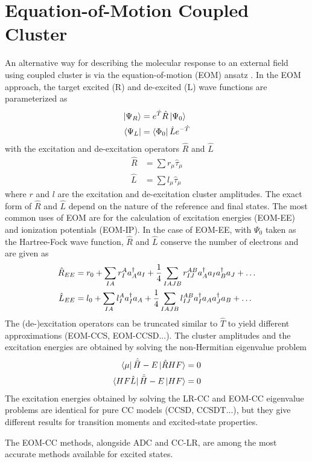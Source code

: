 
\section{Equation-of-Motion Coupled Cluster}

An alternative way for describing the molecular response to an external field using coupled cluster is via the equation-of-motion (EOM) ansatz \cite{Gee1989,EMr1981,Sta1993,Sta1994,Kry2008}. In the EOM approach, the target excited (R) and de-excited (L) wave functions are parameterized as 
\begin{align}
\ket{\smash{\Psi_R}} &= e^{\hat{T}} \hat{R} \ket{\smash{\Psi_0}} \\
\bra{\smash{\Psi_L}} &= \bra{\smash{\Phi_0}} \hat{L} e^{-\hat{T}} 
\end{align}
\noindent with the excitation and de-excitation operators $\hat{R}$ and $\hat{L}$ 
\begin{align}
\hat{R} &= \sum r_{\mu} \hat{\tau}_{\mu} \\
\hat{L} &= \sum l_{\mu} \hat{\tau}_{\mu}
\end{align}
\noindent where $r$ and $l$ are the excitation and de-excitation cluster amplitudes. The exact form of $\hat{R}$ and $\hat{L}$ depend on the nature of the reference and final states. The most common uses of EOM are for the calculation of excitation energies (EOM-EE) and ionization potentials (EOM-IP). In the case of EOM-EE, with $\Psi_0$ taken as the Hartree-Fock wave function, $\hat{R}$ and $\hat{L}$ conserve the number of electrons and are given as
\begin{align}
\hat{R}_{EE} &= r_0 + \sum_{IA} r_I^A a_A^{\dagger} a_I + \frac{1}{4} \sum_{IAJB} r_{IJ}^{AB} a_A^{\dagger} a_I a_B^{\dagger} a_J + \ldots \\
\hat{L}_{EE} &= l_0 + \sum_{IA} l_I^A a_I^{\dagger} a_A + \frac{1}{4} \sum_{IAJB} l_{IJ}^{AB} a_I^{\dagger} a_A a_J^{\dagger} a_B + \ldots
\end{align}
The (de-)excitation operators can be truncated similar to $\hat{T}$ to yield different approximations (EOM-CCS, EOM-CCSD...). The cluster amplitudes and the excitation energies are obtained 
by solving the non-Hermitian eigenvalue problem 
\begin{align}
\bra{\smash{\mu}} \hat{\bar{H}} - E  \ket{\smash{\hat{R} HF}} &= 0 \\
\bra{\smash{HF \hat{L}}} \hat{\bar{H}} - E \ket{\smash{HF}} &= 0
\end{align}
The excitation energies obtained by solving the LR-CC and EOM-CC eigenvalue problems are identical for pure CC models (CCSD, CCSDT...), but they give different results for transition moments and excited-state properties.

The EOM-CC methods, alongside ADC and CC-LR, are among the most accurate methods available for excited states. 